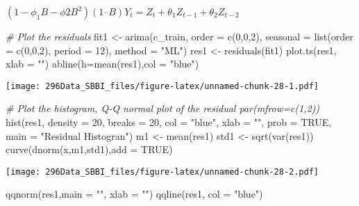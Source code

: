 \documentclass[
]{article}
\newenvironment{Shaded}{\begin{snugshade}}{\end{snugshade}}
\newcommand{\AttributeTok}[1]{\textcolor[rgb]{0.77,0.63,0.00}{#1}}
\newcommand{\CommentTok}[1]{\textcolor[rgb]{0.56,0.35,0.01}{\textit{#1}}}
\newcommand{\ConstantTok}[1]{\textcolor[rgb]{0.00,0.00,0.00}{#1}}
\newcommand{\DecValTok}[1]{\textcolor[rgb]{0.00,0.00,0.81}{#1}}
\newcommand{\FunctionTok}[1]{\textcolor[rgb]{0.00,0.00,0.00}{#1}}
\newcommand{\NormalTok}[1]{#1}
\newcommand{\OtherTok}[1]{\textcolor[rgb]{0.56,0.35,0.01}{#1}}
\newcommand{\StringTok}[1]{\textcolor[rgb]{0.31,0.60,0.02}{#1}}
\begin{document}
\((1 - \phi_1 B - \phi2 B^2) (1 – B) Y_t = Z_t + \theta_1 Z_{t-1}+ \theta_2 Z_{t−2}\)

\begin{Shaded}
\begin{Highlighting}[]
\CommentTok{\# Plot the residuals}
\NormalTok{fit1 }\OtherTok{\textless{}{-}} \FunctionTok{arima}\NormalTok{(c\_train, }\AttributeTok{order =} \FunctionTok{c}\NormalTok{(}\DecValTok{0}\NormalTok{,}\DecValTok{0}\NormalTok{,}\DecValTok{2}\NormalTok{),}
\AttributeTok{seasonal =} \FunctionTok{list}\NormalTok{(}\AttributeTok{order =} \FunctionTok{c}\NormalTok{(}\DecValTok{0}\NormalTok{,}\DecValTok{0}\NormalTok{,}\DecValTok{2}\NormalTok{), }\AttributeTok{period =} \DecValTok{12}\NormalTok{), }\AttributeTok{method =} \StringTok{"ML"}\NormalTok{) }
\NormalTok{res1 }\OtherTok{\textless{}{-}} \FunctionTok{residuals}\NormalTok{(fit1)}
\FunctionTok{plot.ts}\NormalTok{(res1, }\AttributeTok{xlab =} \StringTok{""}\NormalTok{)}
\FunctionTok{abline}\NormalTok{(}\AttributeTok{h=}\FunctionTok{mean}\NormalTok{(res1),}\AttributeTok{col =} \StringTok{"blue"}\NormalTok{)}
\end{Highlighting}
\end{Shaded}

\texttt{[image: 296Data\_SBBI\_files/figure-latex/unnamed-chunk-28-1.pdf]}

\begin{Shaded}
\begin{Highlighting}[]
\CommentTok{\# Plot the histogram, Q{-}Q normal plot of the residual par(mfrow=c(1,2))}
\FunctionTok{hist}\NormalTok{(res1, }\AttributeTok{density =} \DecValTok{20}\NormalTok{, }\AttributeTok{breaks =} \DecValTok{20}\NormalTok{,}
\AttributeTok{col =} \StringTok{"blue"}\NormalTok{, }\AttributeTok{xlab =} \StringTok{""}\NormalTok{, }\AttributeTok{prob =} \ConstantTok{TRUE}\NormalTok{, }\AttributeTok{main =} \StringTok{"Residual Histogran"}\NormalTok{) }
\NormalTok{m1 }\OtherTok{\textless{}{-}} \FunctionTok{mean}\NormalTok{(res1)}
\NormalTok{std1 }\OtherTok{\textless{}{-}} \FunctionTok{sqrt}\NormalTok{(}\FunctionTok{var}\NormalTok{(res1)) }
\FunctionTok{curve}\NormalTok{(}\FunctionTok{dnorm}\NormalTok{(x,m1,std1),}\AttributeTok{add =} \ConstantTok{TRUE}\NormalTok{)}
\end{Highlighting}
\end{Shaded}

\texttt{[image: 296Data\_SBBI\_files/figure-latex/unnamed-chunk-28-2.pdf]}

\begin{Shaded}
\begin{Highlighting}[]
\FunctionTok{qqnorm}\NormalTok{(res1,}\AttributeTok{main =} \StringTok{""}\NormalTok{, }\AttributeTok{xlab =} \StringTok{""}\NormalTok{) }
\FunctionTok{qqline}\NormalTok{(res1, }\AttributeTok{col =} \StringTok{"blue"}\NormalTok{)}
\end{Highlighting}
\end{Shaded}
\end{document}
